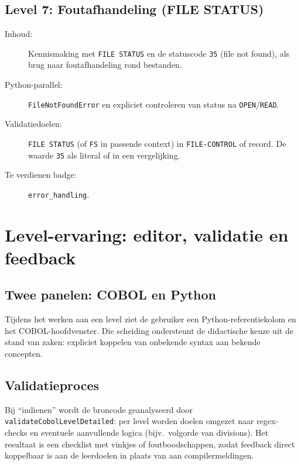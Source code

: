 \subsection{Level 7: Foutafhandeling (FILE STATUS)}
\label{subsec:poc-level-7}

\begin{description}
    \item[Inhoud:] Kennismaking met \texttt{FILE STATUS} en de statuscode \texttt{35} (file not found), als brug naar foutafhandeling rond bestanden.
    \item[Python-parallel:] \texttt{FileNotFoundError} en expliciet controleren van status na \texttt{OPEN}/\texttt{READ}.
    \item[Validatiedoelen:] \texttt{FILE STATUS} (of \texttt{FS} in passende context) in \texttt{FILE-CONTROL} of record. De waarde \texttt{35} als literal of in een vergelijking.
    \item[Te verdienen badge:] \texttt{error\_handling}.
\end{description}

\section{Level-ervaring: editor, validatie en feedback}

\subsection{Twee panelen: COBOL en Python}
Tijdens het werken aan een level ziet de gebruiker een Python-referentiekolom en het COBOL-hoofdvenster.
Die scheiding ondersteunt de didactische keuze uit de stand van zaken: expliciet koppelen van onbekende syntax aan bekende concepten.

\subsection{Validatieproces}
Bij ``indienen'' wordt de broncode geanalyseerd door \texttt{validateCobolLevelDetailed}: per level worden doelen omgezet naar regex-checks en eventuele aanvullende logica (bijv.\ volgorde van divisions).
Het resultaat is een checklist met vinkjes of foutboodschappen, zodat feedback direct koppelbaar is aan de leerdoelen in plaats van aan compilermeldingen.

